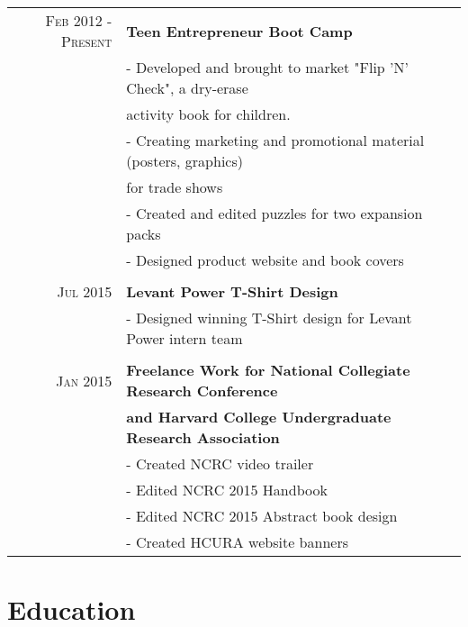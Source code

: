 \documentclass[a4paper,10pt]{article} %
\begin{document}
\begin{tabular}{r|p{11cm}}
\textsc{Feb 2012 - Present} & \textbf{Teen Entrepreneur Boot Camp} \\ 
& - Developed and brought to market "Flip 'N' Check", a dry-erase \\
& activity book for children. \\
& - Creating marketing and promotional material (posters, graphics) \\
& for trade shows \\
& - Created and edited puzzles for two expansion packs \\
& - Designed product website and book covers \\

\\
\textsc{Jul 2015} & \textbf{Levant Power T-Shirt Design} \\
& - Designed winning T-Shirt design for Levant Power intern team \\

\\
\textsc{Jan 2015} & \textbf{Freelance Work for National Collegiate Research Conference} \\
& \textbf{and Harvard College Undergraduate Research Association} \\
& - Created NCRC video trailer \\
& - Edited NCRC 2015 Handbook \\
& - Edited NCRC 2015 Abstract book design \\
& - Created HCURA website banners \\
\end{tabular}


\section{Education}
\end{document}
